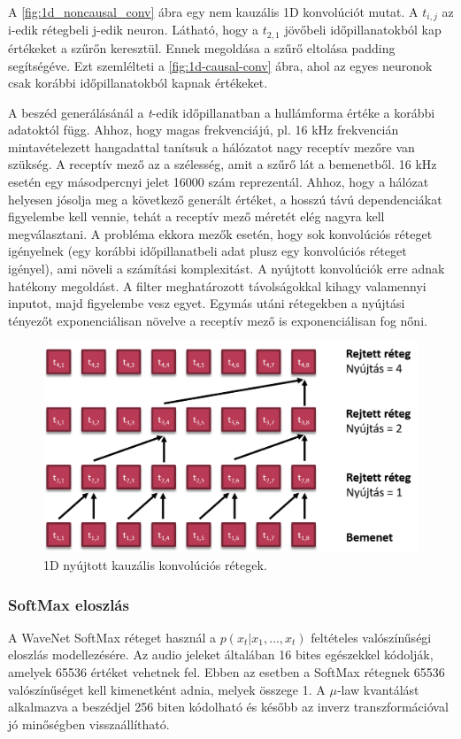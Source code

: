 \newpage

A \ref{fig:1d_noncausal_conv} ábra egy nem kauzális 1D konvolúciót mutat. A $t_{i, j}$ az i-edik rétegbeli j-edik neuron. Látható, hogy a $t_{2,1}$ jövőbeli időpillanatokból kap értékeket a szűrőn keresztül. Ennek megoldása a szűrő eltolása padding segítségéve. Ezt szemlélteti a \ref{fig:1d-causal-conv} ábra, ahol az egyes neuronok csak korábbi időpillanatokból kapnak értékeket. 

A beszéd generálásánál a \emph{t}-edik időpillanatban a hullámforma értéke a korábbi adatoktól függ. Ahhoz, hogy magas frekvenciájú, pl. 16 kHz frekvencián mintavételezett 
hangadattal tanítsuk a hálózatot nagy receptív mezőre van szükség. A receptív mező az a szélesség, amit a szűrő lát a bemenetből. 16 kHz esetén egy másodpercnyi jelet 16000 szám reprezentál. Ahhoz, hogy a hálózat helyesen jósolja meg a következő generált értéket, a hosszú távú dependenciákat figyelembe kell vennie, tehát a receptív mező méretét elég nagyra kell megválasztani. A probléma ekkora mezők esetén, hogy sok konvolúciós réteget igényelnek (egy korábbi időpillanatbeli adat plusz egy konvolúciós réteget igényel), ami növeli a számítási komplexitást. A nyújtott konvolúciók erre adnak hatékony megoldást. A filter meghatározott távolságokkal kihagy valamennyi inputot, majd figyelembe vesz egyet. Egymás utáni rétegekben a nyújtási tényezőt exponenciálisan növelve a receptív mező is exponenciálisan fog nőni.

\begin{figure}[!ht]
	\centering
	\includegraphics[width=150mm, keepaspectratio]{figures/1d-dilated-conv.png}
	\caption{1D nyújtott kauzális konvolúciós rétegek.}
	\label{fig:1d_dilated_conv}
\end{figure}

\subsubsection{SoftMax eloszlás}
A WaveNet SoftMax réteget használ a $p(x_t|x_1,\dots,x_t)$ feltételes valószínűségi eloszlás modellezésére.
Az audio jeleket általában 16 bites egészekkel kódolják, amelyek 65536 értéket vehetnek fel. Ebben az esetben a SoftMax rétegnek 65536 valószínűséget kell kimenetként adnia, melyek összege 1. A $\mu$-law kvantálást alkalmazva a beszédjel 256 biten kódolható és később az inverz transzformációval jó minőségben visszaállítható.

